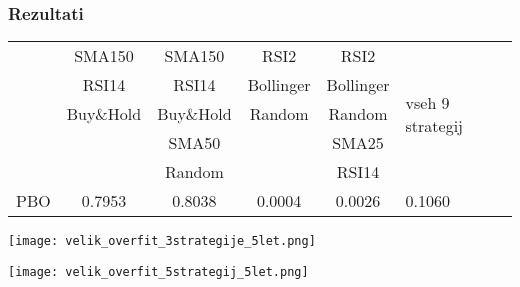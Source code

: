 \documentclass{beamer}
\begin{document}

\begin{frame}
\frametitle{Rezultati}
\begin{tabular}{|c|c|c|c|c|p{1.2cm}|}
\hline
\multirow{5}{*}{} & SMA150 & SMA150 & RSI2 & RSI2 & \multirow{5}{1.2cm}{vseh 9 strategij} \\
& RSI14 & RSI14 & Bollinger & Bollinger & \\
& Buy\&Hold &  Buy\&Hold  & Random & Random & \\
& & SMA50 & & SMA25 & \\
& & Random &   & RSI14 &  \\
\hline
PBO & 0.7953 & 0.8038 & 0.0004 & 0.0026 & 0.1060 \\
 \hline
\end{tabular}
\end{frame}



\begin{frame}
\texttt{[image: velik\_overfit\_3strategije\_5let.png]}
\end{frame}

\begin{frame}
\texttt{[image: velik\_overfit\_5strategij\_5let.png]}
\end{frame}
\end{document}
